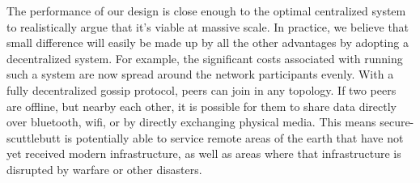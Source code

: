 \documentclass[sigconf]{acmart}
\begin{document}
The performance of our design is close enough to the optimal
centralized system to realistically argue that it's viable at massive
scale. In practice, we believe that small difference will easily be
made up by all the other advantages by adopting a decentralized
system.  For example, the significant costs associated with running
such a system are now spread around the network participants
evenly. With a fully decentralized gossip protocol, peers can join in
any topology. If two peers are offline, but nearby each other, it is
possible for them to share data directly over bluetooth, wifi, or by
directly exchanging physical media. This means secure-scuttlebutt is
potentially able to service remote areas of the earth that have not
yet received modern infrastructure, as well as areas where that
infrastructure is disrupted by warfare or other disasters.

\end{document}
